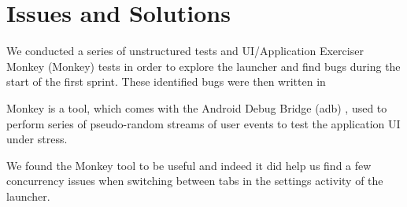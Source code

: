 
\section{Issues and Solutions}

We conducted a series of unstructured tests and UI/Application Exerciser Monkey (Monkey)  tests in order to explore the launcher and find bugs during the start of the first sprint. These identified bugs were then written in 


Monkey is a tool, which comes with the Android Debug Bridge (adb) , used to perform series of pseudo-random streams of user events to test the application UI under stress.

We found the Monkey tool to be useful and indeed it did help us find a few concurrency issues when switching between tabs in the settings activity of the launcher.